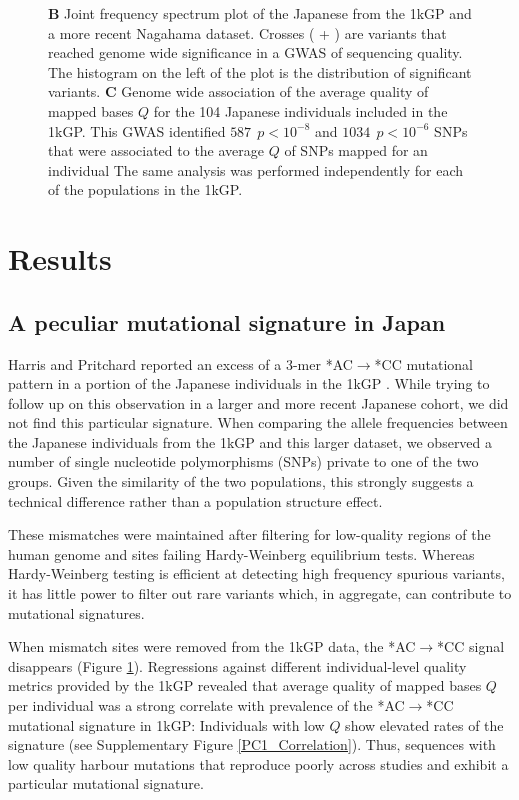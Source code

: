 \documentclass[9pt,lineno]{elife}
\begin{document}
\begin{figure}
{\textbf{B} 
Joint frequency spectrum plot of the Japanese from the 1kGP and a more recent Nagahama dataset.
Crosses ( + ) are variants that reached genome wide significance in a GWAS of sequencing quality. 
The histogram on the left of the plot is the distribution of significant variants. 
\textbf{C} 
Genome wide association of the average quality of mapped bases $Q$ for the 104 Japanese individuals included in the 1kGP. This GWAS identified $587\ \  p < 10^{-8}$ and $1034\ \ p < 10^{-6}$ SNPs that were associated to the average $Q$ of SNPs mapped for an individual
The same analysis was performed independently for each of the populations in the 1kGP. }
 \label{SFS}
\end{figure}


\section{Results}

			
\subsection{A peculiar mutational signature in Japan}			
	
Harris and Pritchard reported an excess of a 3-mer *AC${\rightarrow}$*CC mutational pattern in a portion of the Japanese individuals in the 1kGP \citep{Harris2017a}.
While trying to follow up on this observation in a larger and more recent Japanese cohort, we did not find this particular signature.
When comparing the allele frequencies between the Japanese individuals from the 1kGP and this larger dataset, we observed a number of single nucleotide polymorphisms (SNPs) private to one of the two groups.
Given the similarity of the two populations, this strongly suggests a technical difference rather than a population structure effect.

These mismatches were maintained after filtering for low-quality regions of the human genome and sites failing Hardy-Weinberg equilibrium tests.
Whereas Hardy-Weinberg testing is efficient at detecting high frequency spurious variants, it has little power to filter out rare variants which, in aggregate, can contribute to mutational signatures.


When mismatch sites were removed from the 1kGP data, the  *AC${\rightarrow}$*CC signal disappears (Figure \ref{SFS}).
Regressions against different individual-level quality metrics provided by the 1kGP revealed that average quality of mapped bases  $Q$ per individual was a strong correlate with prevalence of the  *AC${\rightarrow}$*CC mutational signature in 1kGP:
Individuals with low $Q$ show elevated rates of the signature (see Supplementary Figure \ref{PC1_Correlation}).
Thus, sequences with low quality harbour mutations that reproduce poorly across studies and exhibit a particular mutational signature. 
\end{document}
